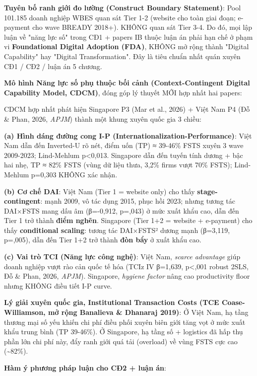 \documentclass[12pt,a4paper]{article}
\begin{document}
\textbf{Tuyên bố ranh giới đo lường (Construct Boundary Statement)}:
Pool 101.185 doanh nghiệp WBES quan sát Tier 1-2 (website cho toàn giai
đoạn; e-payment cho wave BREADY 2018+). KHÔNG quan sát Tier 3-4. Do đó,
mọi lập luận về "năng lực số" trong CĐ1 + papers IB thuộc luận án phải
hạn chế ở phạm vi \textbf{Foundational Digital Adoption (FDA)}, KHÔNG mở
rộng thành "Digital Capability" hay "Digital Transformation". Đây là
tiêu chuẩn nhất quán xuyên CĐ1 / CĐ2 / luận án 5 chương.

\textbf{Mô hình Năng lực số phụ thuộc bối cảnh (Context-Contingent
Digital Capability Model, CDCM)}, đóng góp lý thuyết MỚI hợp nhất hai
papers:

CDCM hợp nhất phát hiện Singapore P3 (Mar et al., 2026) + Việt Nam P4
(Đỗ \& Phan, 2026, \emph{APJM}) thành một khung xuyên quốc gia 3 chiều:

\textbf{(a) Hình dáng đường cong I-P
(Internationalization-Performance)}: Việt Nam dẫn đến Inverted-U rõ nét,
điểm uốn (TP) ≈ 39-46\% FSTS xuyên 3 wave 2009-2023; Lind-Mehlum
p\textless0,013. Singapore dẫn đến tuyến tính dương + bậc hai nhẹ, TP ≈
82\% FSTS (vùng dữ liệu thưa, 3,2\% firms vượt 70\% FSTS); Lind-Mehlum
p=0,303 KHÔNG xác nhận.

\textbf{(b) Cơ chế DAI}: Việt Nam (Tier 1 = website only) cho thấy
\textbf{stage-contingent}: mạnh 2009, vô tác dụng 2015, phục hồi 2023;
nhưng tương tác DAI×FSTS mang dấu âm (β=-0,912, p=,043) ở mức xuất khẩu
cao, dẫn đến Tier 1 trở thành \textbf{điểm nghẽn}. Singapore (Tier 1+2 =
website + e-payment) cho thấy \textbf{conditional scaling}: tương tác
DAI×FSTS² dương mạnh (β=3,119, p=,005), dẫn đến Tier 1+2 trở thành
\textbf{đòn bẩy} ở xuất khẩu cao.

\textbf{(c) Vai trò TCI (Năng lực công nghệ)}: Việt Nam, \emph{scarce
advantage} giúp doanh nghiệp vượt rào cản quốc tế hóa (TCIz IV β=1,639,
p\textless,001 robust 2SLS, Đỗ \& Phan, 2026, \emph{APJM}). Singapore,
\emph{hygiene factor} nâng cao productivity floor nhưng KHÔNG điều tiết
I-P curve.

\textbf{Lý giải xuyên quốc gia, Institutional Transaction Costs (TCE
Coase-Williamson, mở rộng Banalieva \& Dhanaraj 2019)}: Ở Việt Nam, hạ
tầng thương mại số yếu khiến chi phí điều phối xuyên biên giới tăng vọt
ở mức xuất khẩu trung bình (TP 39-46\%). Ở Singapore, hạ tầng số +
logistics đã hấp thụ phần lớn chi phí này, đẩy ranh giới quá tải
(overload) về vùng FSTS cực cao (\textasciitilde82\%).

\textbf{Hàm ý phương pháp luận cho CĐ2 + luận án}:
\end{document}
